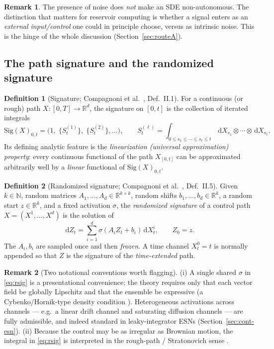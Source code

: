 \documentclass[11pt]{article}
\theoremstyle{definition}
\newtheorem{definition}{Definition}[section]
\newtheorem{remark}{Remark}[section]
\theoremstyle{plain}
\newcommand{\R}{\mathbb{R}}
\newcommand{\Sig}{\mathrm{Sig}}
\newcommand{\dd}{\,\mathrm{d}}
\begin{document}
\begin{remark}
The presence of noise does \emph{not} make an SDE non-autonomous. The distinction that matters for reservoir computing is whether a signal enters as an \emph{external input/control} one could in principle choose, versus as intrinsic noise. This is the hinge of the whole discussion (Section~\ref{sec:routeA}).
\end{remark}

\subsection{The path signature and the randomized signature}

\begin{definition}[Signature; Compagnoni et al.\ \cite{compagnoni2023}, Def.\ II.1]
\label{def:sig}
For a continuous (or rough) path $X:[0,T]\to\R^d$, the signature on $[0,t]$ is the collection of iterated integrals
\[
\Sig(X)_{0,t} = \Big(1,\; \{S^{(1)}_t\},\; \{S^{(2)}_t\},\dots\Big),\qquad
S^{(\ell)}_t = \!\!\int_{0\le s_1\le\cdots\le s_\ell\le t}\!\! \dd X_{s_1}\otimes\cdots\otimes \dd X_{s_\ell}.
\]
Its defining analytic feature is the \emph{linearization (universal approximation) property}: every continuous functional of the path $X_{[0,t]}$ can be approximated arbitrarily well by a \emph{linear} functional of $\Sig(X)_{0,t}$.
\end{definition}

\begin{definition}[Randomized signature; Compagnoni et al.\ \cite{compagnoni2023}, Def.\ II.5]
\label{def:rsig}
Given $k\in\mathbb{N}$, random matrices $A_1,\dots,A_d\in\R^{k\times k}$, random shifts $b_1,\dots,b_d\in\R^{k}$, a random start $z\in\R^k$, and a fixed activation $\sigma$, the \emph{randomized signature} of a control path $X=(X^1,\dots,X^d)$ is the solution of
\begin{equation}
\label{eq:rsig}
\dd Z_t = \sum_{i=1}^{d}\sigma\!\left(A_i Z_t + b_i\right)\dd X^i_t,\qquad Z_0=z .
\end{equation}
The $A_i,b_i$ are sampled once and then \emph{frozen}. A time channel $X^0_t=t$ is normally appended so that $Z$ is the signature of the \emph{time-extended} path.
\end{definition}

\begin{remark}[Two notational conventions worth flagging]
\label{rem:conventions}
(i) A single shared $\sigma$ in \eqref{eq:rsig} is a presentational convenience; the theory requires only that each vector field be globally Lipschitz and that the ensemble be expressive (a Cybenko/Hornik-type density condition \cite{cybenko1989,hornik1989}). Heterogeneous activations across channels --- e.g.\ a linear drift channel and saturating diffusion channels --- are fully admissible, and indeed standard in leaky-integrator ESNs (Section~\ref{sec:cont-esn}).
(ii) Because the control may be as irregular as Brownian motion, the integral in \eqref{eq:rsig} is interpreted in the rough-path / Stratonovich sense \cite{frizvictoir2010}.
\end{remark}
\end{document}
